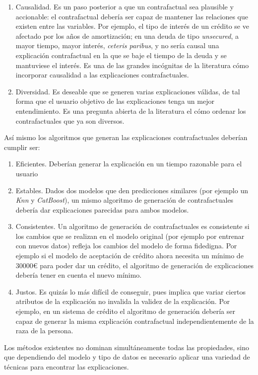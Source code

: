 \documentclass[12pt]{report} %
\begin{document}
\begin{enumerate}
    \item Causalidad. Es un paso posterior a que un contrafactual sea plausible y accionable: el contrafactual debería ser capaz de mantener las relaciones que existen entre las variables. Por ejemplo, el tipo de interés de un crédito se ve afectado por los años de amortización; en una deuda de tipo \textit{unsecured}, a mayor tiempo, mayor interés, \textit{ceteris paribus}, y no sería causal una explicación contrafactual en la que se baje el tiempo de la deuda y se mantuviese el interés. Es una de las grandes incógnitas de la literatura cómo incorporar causalidad a las explicaciones contrafactuales.
    \item Diversidad. Es deseable que se generen varias explicaciones válidas, de tal forma que el usuario objetivo de las explicaciones tenga un mejor entendimiento. Es una pregunta abierta de la literatura el cómo ordenar los contrafactuales que ya son diversos.
\end{enumerate}

Así mismo los algoritmos que generan las explicaciones contrafactuales deberían cumplir ser:
\begin{enumerate}
    \item Eficientes. Deberían generar la explicación en un tiempo razonable para el usuario
    \item Estables. Dados dos modelos que den predicciones similares (por ejemplo un \textit{Knn} y \textit{CatBoost}), un mismo algoritmo de generación de contrafactuales debería dar explicaciones parecidas para ambos modelos.
    \item Consistentes. Un algoritmo de generación de contrafactuales es consistente si los cambios que se realizan en el modelo original (por ejemplo por entrenar con nuevos datos) refleja los cambios del modelo de forma fidedigna. Por ejemplo si el modelo de aceptación de crédito ahora necesita un mínimo de 30000€ para poder dar un crédito, el algoritmo de generación de explicaciones debería tener en cuenta el nuevo mínimo.
    \item Justos. Es quizás lo más difícil de conseguir, pues implica que variar ciertos atributos de la explicación no invalida la validez de la explicación. Por ejemplo, en un sistema de crédito el algoritmo de generación debería ser capaz de generar la misma explicación contrafactual independientemente de la raza de la persona.
\end{enumerate}
Los métodos existentes no dominan simultáneamente todas las propiedades, sino que dependiendo del modelo y tipo de datos es necesario aplicar una variedad de técnicas para encontrar las explicaciones.
\end{document}
